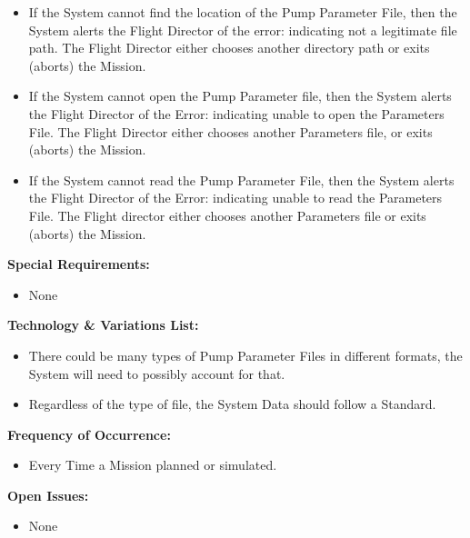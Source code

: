 \documentclass[letterpaper]{article}
\begin{document}
\begin{itemize}
   \item[2a,3a]If the System cannot find the location of the Pump 
      Parameter File, then the System alerts the Flight Director of 
      the error:  indicating not a legitimate file path.  The Flight 
      Director either chooses another directory path or exits 
      (aborts) the Mission.
   \item[4a]If the System cannot open the Pump Parameter file, then 
      the System alerts the Flight Director of the Error:  indicating
      unable to open the Parameters File.  The Flight Director either
      chooses another Parameters file, or exits (aborts) the Mission.
   \item[5a]If the System cannot read the Pump Parameter File, then
      the System alerts the Flight Director of the Error:  indicating
      unable to read the Parameters File.  The Flight director either
      chooses another Parameters file or exits (aborts) the Mission.
\end{itemize}
\textbf{Special Requirements:}
\begin{itemize}
   \item None
\end{itemize}
\textbf{Technology \& Variations List:}
\begin{itemize}
   \item There could be many types of Pump Parameter Files in
      different formats, the System will need to possibly account for
      that.
   \item Regardless of the type of file, the System Data should follow
      a Standard.
\end{itemize}
\textbf{Frequency of Occurrence:}
\begin{itemize}
   \item Every Time a Mission planned or simulated.
\end{itemize}
\textbf{Open Issues:}
\begin{itemize}
   \item None
\end{itemize}
\end{document}
